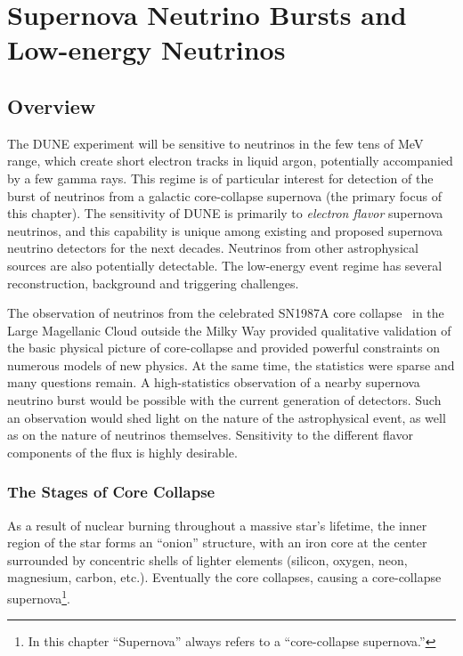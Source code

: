 \chapter{Supernova Neutrino Bursts and Low-energy Neutrinos}
\label{ch:physics-snblowe}

\section{Overview}
\label{sec:physics-snblowe-overview}

The DUNE experiment will be sensitive to neutrinos in the few
tens of MeV range, which create short electron tracks in liquid argon, potentially accompanied by a few
gamma rays. %
This regime is of
particular interest for detection of the burst of neutrinos from a galactic
core-collapse supernova (the primary focus of this chapter). 
The sensitivity of DUNE is primarily to \textit{electron flavor} supernova neutrinos, and this capability is unique among existing and proposed supernova neutrino detectors for the next decades.  
Neutrinos from other astrophysical sources are also potentially detectable.  
The low-energy event regime has several reconstruction, background and triggering challenges. 

The observation of neutrinos from the celebrated SN1987A core
collapse~\cite{Bionta:1987qt,Hirata:1987hu} in the Large Magellanic
Cloud outside the Milky Way %
provided qualitative validation of the basic physical picture of core-collapse and provided powerful constraints on numerous models of new physics. At the same time, the statistics were sparse 
and many questions remain.  A high-statistics observation of a
nearby supernova neutrino burst would be possible with the current
generation of detectors. Such an observation would shed light on 
the nature of the astrophysical event, as well as on the nature of
neutrinos themselves.  Sensitivity to the different flavor components
of the flux is highly desirable.

\subsection{The Stages of Core Collapse} %

As a result of nuclear burning throughout a massive star's lifetime, the %
inner region of the star forms an ``onion'' structure, with an iron core at the center surrounded by concentric shells of lighter elements (silicon, oxygen, neon, magnesium, carbon, etc.). Eventually the core collapses, causing 
a core-collapse supernova\footnote{In this chapter ``Supernova'' always refers to a ``core-collapse supernova.''}.
 
